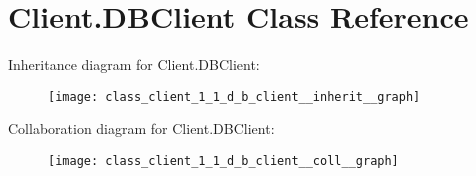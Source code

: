 \hypertarget{class_client_1_1_d_b_client}{}\section{Client.\+D\+B\+Client Class Reference}
\label{class_client_1_1_d_b_client}


Inheritance diagram for Client.\+D\+B\+Client\+:
\nopagebreak
\begin{figure}[H]
\begin{center}
\leavevmode
\texttt{[image: class\_client\_1\_1\_d\_b\_client\_\_inherit\_\_graph]}
\end{center}
\end{figure}


Collaboration diagram for Client.\+D\+B\+Client\+:
\nopagebreak
\begin{figure}[H]
\begin{center}
\leavevmode
\texttt{[image: class\_client\_1\_1\_d\_b\_client\_\_coll\_\_graph]}
\end{center}
\end{figure}
